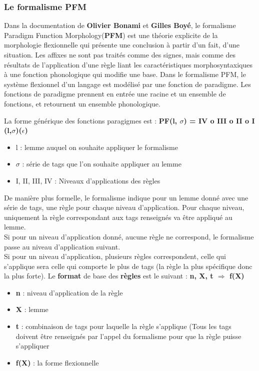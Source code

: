 \subsubsection{Le formalisme PFM}
Dans la documentation \cite{Formalisme} de \textbf{Olivier Bonami} et \textbf{Gilles Boyé}, le formalisme Paradigm Function Morphology(\textbf{PFM})  est une théorie explicite de la morphologie flexionnelle qui présente une conclusion à partir d'un fait, d'une situation. Les affixes ne sont pas traités comme des signes, mais comme des résultats de l'application d'une règle liant les caractéristiques morphosyntaxiques à une fonction phonologique qui modifie une base.
Dans le formalisme PFM, le système flexionnel d'un langage est modélisé par une fonction de paradigme.
Les fonctions de paradigme prennent en entrée une racine et un ensemble de fonctions, et retournent un ensemble phonologique.

La forme générique des fonctions paragigmes est : \textbf{PF(l, $\sigma$) = IV o III o II o I (l,$\sigma$)($\epsilon$)}
\begin{itemize}
    \item l : lemme auquel on souhaite appliquer le formalisme
    \item $\sigma$ : série de tags que l'on souhaite appliquer au lemme
    \item I, II, III, IV : Niveaux d'applications des règles
\end{itemize}

\smallbreak

De manière plus formelle, le formalisme indique pour un lemme donné avec une série de tags, une règle pour chaque niveau d'application. Pour chaque niveau, uniquement la règle correspondant  aux tags renseignés va être appliqué au lemme.\\
Si pour un niveau d'application donné, aucune règle ne correspond, le formalisme passe au niveau d'application suivant. \\
Si pour un niveau d'application, plusieurs règles correspondent, celle qui s'applique sera celle qui comporte le plus de tags (la règle la plus spécifique donc la plus forte).
Le \textbf{format} de base des \textbf{règles} est le suivant : \textbf{n, X, t $\Longrightarrow$ f(X) } \\
\begin{itemize}
    \item \textbf{n} : niveau d’application de la règle
    \item \textbf{X} : lemme
    \item \textbf{t} : combinaison de tags pour laquelle la règle s'applique (Tous les tags doivent être renseignés par l'appel du formalisme pour que la règle puisse s'appliquer
    \item \textbf{f(X)} : la forme flexionnelle
\end{itemize}

